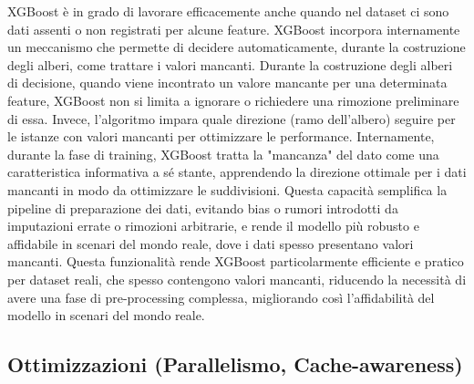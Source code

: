 \documentclass[a4paper,12pt]{report}
\begin{document}
	XGBoost è in grado di lavorare efficacemente anche quando nel dataset ci sono dati assenti o non registrati per alcune feature. XGBoost incorpora internamente un meccanismo che permette di decidere automaticamente, durante la costruzione degli alberi, come trattare i valori mancanti. Durante la costruzione degli alberi di decisione, quando viene incontrato un valore mancante per una determinata feature, XGBoost non si limita a ignorare o richiedere una rimozione preliminare di essa. Invece, l'algoritmo impara quale direzione (ramo dell’albero) seguire per le istanze con valori mancanti per ottimizzare le performance. Internamente, durante la fase di training, XGBoost tratta la "mancanza" del dato come una caratteristica informativa a sé stante, apprendendo la direzione ottimale per i dati mancanti in modo da ottimizzare le suddivisioni. Questa capacità semplifica la pipeline di preparazione dei dati, evitando bias o rumori introdotti da imputazioni errate o rimozioni arbitrarie, e rende il modello più robusto e affidabile in scenari del mondo reale, dove i dati spesso presentano valori mancanti. Questa funzionalità rende XGBoost particolarmente efficiente e pratico per dataset reali, che spesso contengono valori mancanti, riducendo la necessità di avere una fase di pre-processing complessa, migliorando così l'affidabilità del modello in scenari del mondo reale.
	
	\subsection{Ottimizzazioni (Parallelismo, Cache-awareness)}
	
\end{document}
